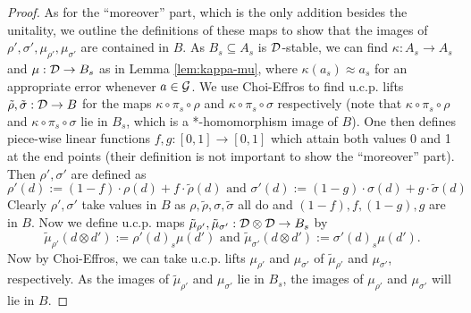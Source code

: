 \documentclass[12pt]{amsart}
\begin{document}
\begin{lemma}
\begin{proof}
As for the ``moreover'' part, which is the only addition besides the unitality, we outline the definitions of these maps to show that the images of $\rho',\sigma',\mu_{\rho'},\mu_{\sigma'}$ are contained in $B$. As $B_s \subseteq A_s$ is $\mathcal{D}$-stable, we can find $\kappa: A_s \to A_s$ and $\mu: \mathcal{D} \to B_s$ as in Lemma \ref{lem:kappa-mu}, where $\kappa(a_s) \approx a_s$ for an appropriate error whenever $a \in \mathcal{G}$. We use Choi-Effros to find u.c.p. lifts $\tilde{\rho},\tilde{\sigma}: \mathcal{D} \to B$ for the maps $\kappa \circ \pi_s \circ \rho$ and $\kappa \circ \pi_s \circ \sigma$ respectively (note that $\kappa \circ \pi_s \circ \rho$ and $\kappa \circ \pi_s \circ \sigma$ lie in $B_s$, which is a *-homomorphism image of $B$). One then defines piece-wise linear functions $f,g: [0,1] \to [0,1]$ which attain both values 0 and 1 at the end points (their definition is not important to show the ``moreover'' part). Then $\rho',\sigma'$ are defined as
\begin{equation}
\rho'(d) := (1-f)\cdot \rho(d)  + f\cdot\tilde{\rho}(d) \text{ and } \sigma'(d) := (1-g)\cdot\sigma(d) + g\cdot \tilde{\sigma}(d)
\end{equation}
Clearly $\rho',\sigma'$ take values in $B$ as $\rho,\tilde{\rho},\sigma,\tilde{\sigma}$ all do and $(1-f),f,(1-g),g$ are in $B$. Now we define u.c.p. maps $\tilde{\mu}_{\rho'},\tilde{\mu}_{\sigma'}: \mathcal{D} \otimes \mathcal{D} \to B_s$ by
\begin{equation}
\tilde{\mu}_{\rho'}(d \otimes d') := \rho'(d)_s\mu(d') \text{ and }\tilde{\mu}_{\sigma'}(d \otimes d') := \sigma'(d)_s\mu(d').
\end{equation}
Now by Choi-Effros, we can take u.c.p. lifts $\mu_{\rho'}$ and $\mu_{\sigma'}$ of $\tilde{\mu}_{\rho'}$ and $\mu_{\sigma'}$, respectively. As the images of $\tilde{\mu}_{\rho'}$ and $\mu_{\sigma'}$ lie in $B_s$, the images of $\mu_{\rho'}$ and $\mu_{\sigma'}$ will lie in $B$. 
\end{proof}
\end{lemma}
\end{document}
